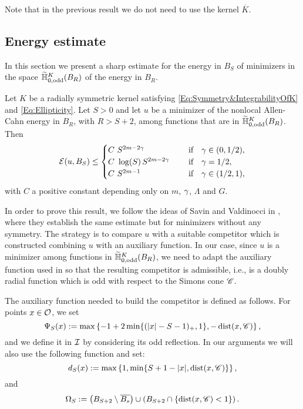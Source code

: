 Note that in the previous result we do not need to use the kernel $\overline{K}$.


\subsection{Energy estimate}

In this section we present a sharp estimate for the energy in $B_S$ of minimizers in the space $\widetilde{\mathbb{H}}^K_{0, \mathrm{odd}}(B_R)$ of the energy in $B_R$.






\begin{theorem}
	\label{Th:EnergyEstimate} Let $K$ be a radially symmetric kernel satisfying \eqref{Eq:Symmetry&IntegrabilityOfK} and \eqref{Eq:Ellipticity}. Let $S>0$ and let $u$ be a minimizer of the nonlocal Allen-Cahn energy in $B_{R}$, with $R>S+2$, among functions that are in $\widetilde{\mathbb{H}}^K_{0, \mathrm{odd}}(B_R)$. Then
	$$ \mathcal{E} (u,B_S) \leq \begin{cases}
	C \ S^{2m-2\gamma}\ \ \ \ &\textrm{if } \ \ \gamma\in(0,1/2),\\
	C\ \log(S)\,S^{2m-2\gamma}\ \ \ \ &\textrm{if } \ \ \gamma=1/2,\\
	C \ S^{2m-1}\ \ \ \ &\textrm{if } \ \ \gamma\in(1/2,1),\\
	\end{cases} $$
	with $C$ a positive constant depending only on $m$, $\gamma$, $\Lambda$ and $G$.
\end{theorem}

In order to prove this result, we follow the ideas of Savin and Valdinocci in \cite{SavinValdinoci-EnergyEstimate}, where they establish the same estimate but for minimizers without any symmetry. The strategy is to compare $u$ with a suitable competitor which is constructed combining $u$ with an auxiliary function. In our case, since $u$ is a minimizer among functions in $\widetilde{\mathbb{H}}^K_{0, \mathrm{odd}}(B_R)$, we need to adapt the auxiliary function used in \cite{SavinValdinoci-EnergyEstimate} so that the resulting competitor is admissible, i.e., is a doubly radial function which is odd with  respect to the Simons cone $\mathscr{C}$.

The auxiliary function needed to build the competitor is defined as follows. For points $x\in \mathcal{O}$, we set
$$ \Psi_S(x) := \max\left\{-1+2\min\{(|x|-S-1)_+,1\},-\operatorname{dist}(x,\mathscr{C}) \right\},  $$
and we define it in $\mathcal{I}$ by considering its odd reflection. In our arguments we will also use the following function and set:
$$ d_S(x) := \max\left\{1,\min\{S+1-|x|,\operatorname{dist}(x,\mathscr{C})\} \right\},  $$
and
\begin{equation}
\label{Eq:DefOmegaS}
\Omega_S := \left( B_{S+2}\setminus \overline{B_s} \right) \cup \left( B_{S+2} \cap \{\operatorname{dist}(x,\mathscr{C})< 1\}\right).
\end{equation} 

